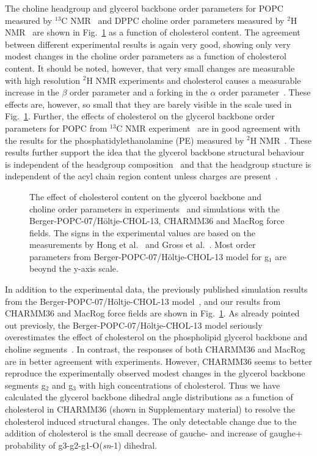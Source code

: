 \documentclass[pre,aps,floatfix,authordate1-4,twocolumn]{revtex4-1}
\begin{document}
The choline headgroup and glycerol backbone order parameters for POPC measured by $^{13}$C NMR~\cite{ferreira13} and DPPC choline order parameters 
measured by $^{2}$H NMR~\cite{brown78} are shown in Fig.~\ref{ordPchol} as a function of cholesterol content.
The agreement between different experimental results is again very good, showing only very modest changes in 
the choline order parameters as a function of cholesterol content. It should be noted, however, that very small
changes are measurable with high resolution $^{2}$H NMR experiments
and cholesterol causes a measurable increase in the $\beta$ order parameter and a forking in the $\alpha$ order
parameter~\cite{brown78}. These effects are, however, so small that they are barely visible in the scale used in Fig.~\ref{ordPchol}.
Further, the effects of cholesterol on the glycerol backbone order parameters for POPC from $^{13}$C NMR experiment~\cite{ferreira13} 
are in good agreement with the results for the phosphatidylethanolamine (PE) measured by $^{2}$H NMR~\cite{ghosh82}.
These results further support the idea that the glycerol backbone structural behaviour is independent of the
headgroup composition~\cite{gally81} and that the headgroup stucture is independent of the acyl chain region content unless
charges are present~\cite{scherer87}.
\begin{figure}[]
  \centering
  \caption{\label{ordPchol}
    The effect of cholesterol content on the glycerol backbone and choline order parameters in experiments~\cite{brown78,ferreira13} and simulations
    with the Berger-POPC-07/H\"oltje-CHOL-13, CHARMM36 and MacRog force fields. The signs in the experimental values are based on the measurements by Hong et al.~\cite{hong95a,hong95b} 
    and Gross et al.~\cite{gross97}.  Most order parameters from Berger-POPC-07/H\"oltje-CHOL-13 model for g$_1$ are beoynd the y-axis scale.}
\end{figure}

In addition to the experimental data, the previously published simulation results from the Berger-POPC-07/H\"oltje-CHOL-13 model~\cite{ferreira13},
and our results from CHARMM36 and MacRog force fields  
are shown in Fig.~\ref{ordPchol}. As already pointed out previosly, the Berger-POPC-07/H\"oltje-CHOL-13 model
seriously overestimates the effect of cholesterol on the phospholipid glycerol backbone and choline segments~\cite{ferreira13}.
In contrast, the responses of both CHARMM36 and MacRog are in better agreement
with experiments. However, CHARMM36 seems to better reproduce the experimentally observed modest changes in the glycerol backbone segments 
g$_2$ and g$_3$ with high concentrations of cholesterol. Thus we have calculated the glycerol backbone dihedral angle distributions
as a function of cholesterol in CHARMM36 (shown in Supplementary material) to resolve the cholesterol induced structural changes. The only detectable change due to the
addition of cholesterol is the small decrease of gauche- and increase of gaughe+ probability of g3-g2-g1-O(\textit{sn}-1) dihedral.
\end{document}
